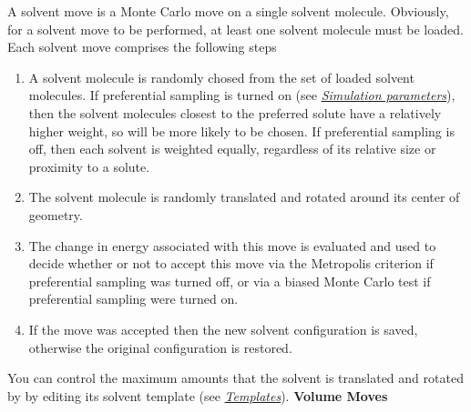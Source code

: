 \documentclass[letterpaper,10pt,english]{manual}
\begin{document}
A solvent move is a Monte Carlo move on a single solvent molecule. Obviously, for a solvent move to be performed, at least one solvent molecule must be loaded. Each solvent move comprises the following steps
\begin{enumerate}
\item {} 
A solvent molecule is randomly chosed from the set of loaded solvent molecules. If preferential sampling is turned on (see \hyperlink{parameters}{\emph{Simulation parameters}}), then the solvent molecules closest to the preferred solute have a relatively higher weight, so will be more likely to be chosen. If preferential sampling is off, then each solvent is weighted equally, regardless of its relative size or proximity to a solute.

\item {} 
The solvent molecule is randomly translated and rotated around its center of geometry.

\item {} 
The change in energy associated with this move is evaluated and used to decide whether or not to accept this move via the Metropolis criterion if preferential sampling was turned off, or via a biased Monte Carlo test if preferential sampling were turned on.

\item {} 
If the move was accepted then the new solvent configuration is saved, otherwise the original configuration is restored.

\end{enumerate}

You can control the maximum amounts that the solvent is translated and rotated by by editing its solvent template (see \hyperlink{temref}{\emph{Templates}}).
\textbf{Volume Moves}
\end{document}
